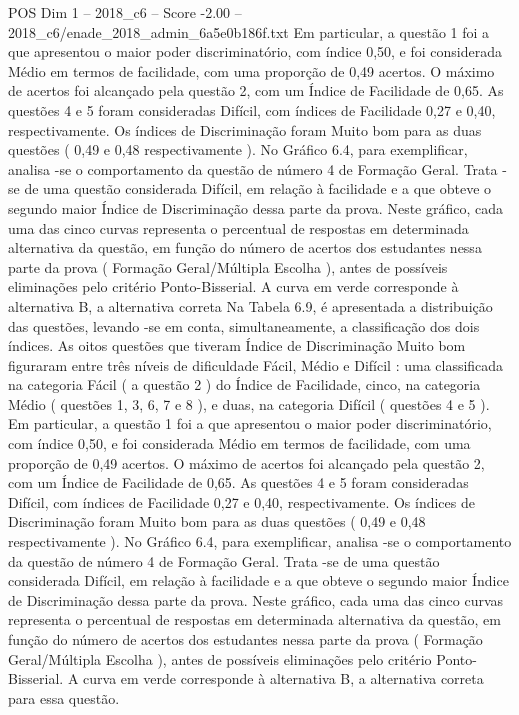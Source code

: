 \begin{textsample}{POS Dim 1 – 2018\_c6 – Score -2.00 – 2018\_c6/enade\_2018\_admin\_6a5e0b186f.txt}
Em particular, a questão 1 foi a que apresentou o maior poder discriminatório, com índice 0,50, e foi considerada Médio em termos de facilidade, com uma proporção de 0,49 acertos.
O máximo de acertos foi alcançado pela questão 2, com um Índice de Facilidade de 0,65.
As questões 4 e 5 foram consideradas Difícil, com índices de Facilidade 0,27 e 0,40, respectivamente.
Os índices de Discriminação foram Muito bom para as duas questões ( 0,49 e 0,48 respectivamente ).
No Gráfico 6.4, para exemplificar, analisa -se o comportamento da questão de número 4 de Formação Geral.
Trata -se de uma questão considerada Difícil, em relação à facilidade e a que obteve o segundo maior Índice de Discriminação dessa parte da prova.
Neste gráfico, cada uma das cinco curvas representa o percentual de respostas em determinada alternativa da questão, em função do número de acertos dos estudantes nessa parte da prova ( Formação Geral/Múltipla Escolha ), antes de possíveis eliminações pelo critério Ponto-Bisserial.
A curva em verde corresponde à alternativa B, a alternativa correta Na Tabela 6.9, é apresentada a distribuição das questões, levando -se em conta, simultaneamente, a classificação dos dois índices.
As oitos questões que tiveram Índice de Discriminação Muito bom figuraram entre três níveis de dificuldade Fácil, Médio e Difícil : uma classificada na categoria Fácil ( a questão 2 ) do Índice de Facilidade, cinco, na categoria Médio ( questões 1, 3, 6, 7 e 8 ), e duas, na categoria Difícil ( questões 4 e 5 ).
Em particular, a questão 1 foi a que apresentou o maior poder discriminatório, com índice 0,50, e foi considerada Médio em termos de facilidade, com uma proporção de 0,49 acertos.
O máximo de acertos foi alcançado pela questão 2, com um Índice de Facilidade de 0,65.
As questões 4 e 5 foram consideradas Difícil, com índices de Facilidade 0,27 e 0,40, respectivamente.
Os índices de Discriminação foram Muito bom para as duas questões ( 0,49 e 0,48 respectivamente ).
No Gráfico 6.4, para exemplificar, analisa -se o comportamento da questão de número 4 de Formação Geral.
Trata -se de uma questão considerada Difícil, em relação à facilidade e a que obteve o segundo maior Índice de Discriminação dessa parte da prova.
Neste gráfico, cada uma das cinco curvas representa o percentual de respostas em determinada alternativa da questão, em função do número de acertos dos estudantes nessa parte da prova ( Formação Geral/Múltipla Escolha ), antes de possíveis eliminações pelo critério Ponto-Bisserial.
A curva em verde corresponde à alternativa B, a alternativa correta para essa questão.

\end{textsample}
